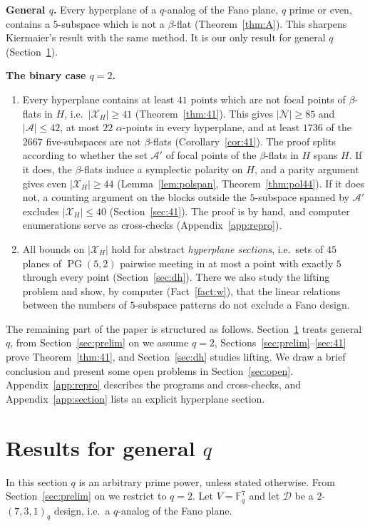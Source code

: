 \documentclass[11pt]{amsart}
\theoremstyle{definition}
\newcommand{\F}{\mathbb{F}}
\newcommand{\D}{\mathcal{D}}
\newcommand{\X}{\mathcal{X}}
\newcommand{\N}{\mathcal{N}}
\newcommand{\A}{\mathcal{A}}
\newcommand{\PG}{\operatorname{PG}}
\begin{document}
\smallskip\noindent\textbf{General $q$.} Every hyperplane of a $q$-analog of the Fano plane, $q$ prime or even, contains a $5$-subspace which is not a $\beta$-flat (Theorem~\ref{thm:A}). This sharpens Kiermaier's result with the same method. It is our only result for general $q$ (Section~\ref{sec:general}).

\smallskip\noindent\textbf{The binary case $q=2$.}
\begin{enumerate}[label=(\roman*),leftmargin=*]
\item Every hyperplane contains at least $41$ points which are not focal points of $\beta$-flats in $H$, i.e.\ $|\X_H|\ge41$ (Theorem~\ref{thm:41}). This gives $|\N|\ge85$ and $|\A|\le42$, at most $22$ $\alpha$-points in every hyperplane, and at least $1736$ of the $2667$ five-subspaces are not $\beta$-flats (Corollary~\ref{cor:41}). The proof splits according to whether the set $\A'$ of focal points of the $\beta$-flats in $H$ spans $H$. If it does, the $\beta$-flats induce a symplectic polarity on $H$, and a parity argument gives even $|\X_H|\ge44$ (Lemma~\ref{lem:polspan}, Theorem~\ref{thm:pol44}). If it does not, a counting argument on the blocks outside the $5$-subspace spanned by $\A'$ excludes $|\X_H|\le40$ (Section~\ref{sec:41}). The proof is by hand, and computer enumerations serve as cross-checks (Appendix~\ref{app:repro}).
\item All bounds on $|\X_H|$ hold for abstract \emph{hyperplane sections}, i.e.\ sets of $45$ planes of $\PG(5,2)$ pairwise meeting in at most a point with exactly $5$ through every point (Section~\ref{sec:dh}). There we also study the lifting problem and show, by computer \textup{(}Fact~\ref{fact:w}\textup{)}, that the linear relations between the numbers of $5$-subspace patterns do not exclude a Fano design.
\end{enumerate}

The remaining part of the paper is structured as follows.
Section~\ref{sec:general} treats general $q$, from Section~\ref{sec:prelim} on we assume $q=2$, Sections~\ref{sec:prelim}--\ref{sec:41} prove Theorem~\ref{thm:41}, and Section~\ref{sec:dh} studies lifting. We draw a brief conclusion and present some open problems in Section~\ref{sec:open}.  Appendix~\ref{app:repro} describes the programs and cross-checks, and Appendix~\ref{app:section} lists an explicit hyperplane section.

\section{\texorpdfstring{Results for general $q$}{Results for general q}}\label{sec:general}
In this section $q$ is an arbitrary prime power, unless stated otherwise. From Section~\ref{sec:prelim} on we restrict to $q=2$. Let $V=\F_q^7$ and let $\D$ be a $2$-$(7,3,1)_q$ design, i.e.\ a $q$-analog of the Fano plane.
\end{document}
